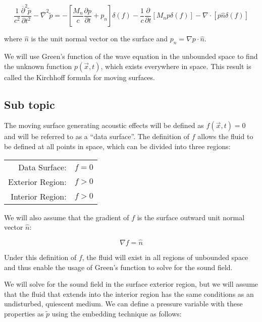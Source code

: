 \documentclass[]{aiaa-tc}%
\begin{document}
\begin{equation} \label{AcousticWaveBody}
\boxed{\dfrac{1}{c^2}\dfrac{ \overline{\partial}^2\widetilde{p}}{\partial t^2}
    - \overline{\nabla}^2 \widetilde{p}
= -\left[ \dfrac{M_n}{c} \dfrac{\partial p}{\partial t} + p_n \right] \delta(f)
    -\dfrac{1}{c} \dfrac{\partial}{\partial t} \left[ M_n p \delta(f) \right]
    -\nabla \cdot \left[ p \hat{n} \delta(f) \right]}
\end{equation}

\noindent where $\hat{n}$ is the unit normal vector on the surface and $p_n = \nabla p \cdot \hat{n}$.

We will use Green’s function of the wave equation in the unbounded space to find the unknown function $p(\vec{x},t)$, which exists everywhere in space. This result is called the Kirchhoff formula for moving surfaces.


\subsection{Sub topic}

The moving surface generating acoustic effects will be defined as $f(\vec{x},t) = 0$ and will be referred to as a ``data surface''.  The definition of $f$ allows the fluid to be defined at all points in space, which can be divided into three regions:

\begin{center}
\begin{tabular}{| r  l |}
  \hline
  Data Surface:    & $f=0$ \\
  Exterior Region: & $f>0$ \\
  Interior Region: & $f>0$ \\
  \hline
\end{tabular}
\end{center}

\noindent We will also assume that the gradient of $f$ is the surface outward unit normal vector $\hat{n}$:

\begin{equation} \label{Gradfnormal}
\nabla f = \hat{n}
\end{equation}

Under this definition of $f$, the fluid will exist in all regions of unbounded space and thus enable the usage of Green's function to solve for the sound field.

We will solve for the sound field in the surface exterior region, but we will assume that the fluid that extends into the interior region has the same conditions as an undisturbed, quiescent medium.  We can define a pressure variable with these properties as $\widetilde{p}$ using the embedding technique as follows:
\end{document}
